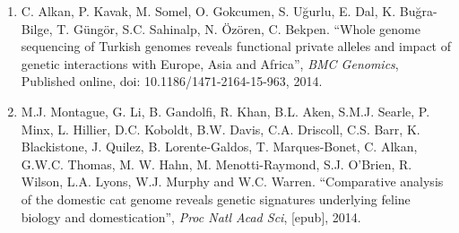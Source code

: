 \begin{enumerate}[i)]
\begin{enumerate}
\item C. Alkan, P. Kavak, M. Somel, O. Gokcumen, S. Uğurlu, E. Dal, K. Buğra-Bilge,  T. Güngör, S.C. Sahinalp, N. Özören, C. Bekpen. ``Whole genome sequencing of Turkish genomes reveals functional private alleles and impact of genetic interactions with Europe, Asia and Africa'', {\em BMC Genomics}, Published online, doi: 10.1186/1471-2164-15-963, 2014.


\item M.J. Montague, G. Li, B. Gandolfi, R. Khan, B.L. Aken, S.M.J. Searle, P. Minx, L. Hillier, D.C. Koboldt, B.W. Davis, C.A. Driscoll, C.S. Barr, K. Blackistone, J. Quilez, B. Lorente-Galdos, T. Marques-Bonet, C. Alkan, G.W.C. Thomas, M. W. Hahn, M. Menotti-Raymond, S.J. O’Brien, R. Wilson, L.A. Lyons, W.J. Murphy and W.C. Warren. ``Comparative analysis of the domestic cat genome reveals genetic signatures underlying feline biology and domestication'', {\em Proc Natl Acad Sci}, [epub], 2014.

\end{enumerate}


\end{enumerate}

